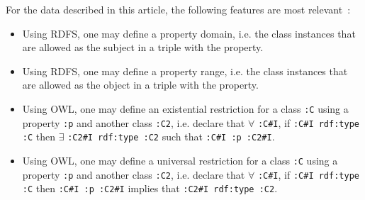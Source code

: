 \documentclass[data,datadescriptor,submit,moreauthors,pdftex]{Definitions/mdpi}
\newcommand{\te}[1] {\texttt{\footnotesize#1}}
\begin{document}
For the data described in this article, the following features are most relevant~\cite{rdfs,ont}:
\begin{itemize}
  \item Using RDFS, one may define a property domain, i.e. the class instances that are allowed as the subject in a triple with the property.
  \item Using RDFS, one may define a property range, i.e. the class instances that are allowed as the object in a triple with the property.
  \item Using OWL, one may define an existential restriction for a class \te{:C} using a property \te{:p} and another class \te{:C2},
    i.e. declare that $\forall$ \te{:C\#I}, if \te{:C\#I rdf:type :C} then $\exists$ \te{:C2\#I rdf:type :C2} such that \te{:C\#I :p :C2\#I}.
  \item Using OWL, one may define a universal restriction for a class \te{:C} using a property \te{:p} and another class \te{:C2},
    i.e. declare that $\forall$ \te{:C\#I}, if \te{:C\#I rdf:type :C} then
    \te{:C\#I :p :C2\#I} implies that \te{:C2\#I rdf:type :C2}.
\end{itemize}
\end{document}
